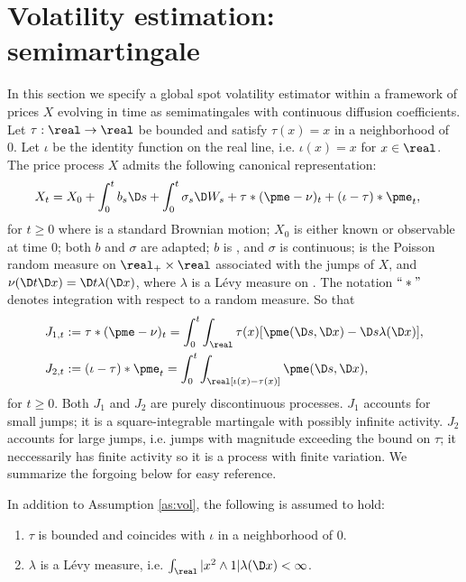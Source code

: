 \section{Volatility estimation: \ito semimartingale} 
In this section we specify a global spot volatility estimator within a framework of prices $X$ evolving in time as \ito semimatingales with continuous diffusion coefficients. 
 Let $\tau: \real \to \real$ be bounded and satisfy $\tau(x) = x$ in a neighborhood of 0.  Let $\iota$ be the identity  function on the real line, i.e.  $\iota(x) = x$ for $x \in \real$. The price process $X$ admits the following  canonical representation:
\begin{align}
  X_t & = X_0 + \int_0^t b_s \D s + \int_0^t \sigma_s \D W_s +  \tau\ast (\pme  - \nu)_t  + (\iota - \tau)\ast \pme_t ,   
  \label{eq:generalsemimartingale}
\end{align}
for $t \ge 0$  where  \sbm is a standard Brownian motion;  $X_0$ is either known or observable at time 0;  both $b$ and $\sigma$ are adapted; $b$ is \cadlag, and $\sigma$ is continuous;  \pme is the Poisson random measure on $\real_+ \times \real$ associated with the jumps of $X$, and $\nu(\D t  \D x)   = \D t  \lambda (\D x) $, where $\lambda$ is a L\'evy  measure on \real. The  notation $``\ast"$ denotes integration with respect to a random measure. So that 
\begin{align}
  &J_{1,t} :=  \tau\ast (\pme  - \nu)_t = \int_0^t\int_\real \tau(x) [\pme(\D s, \D x)   -  \D s \lambda(\D x)], \notag\\
  & J_{2,t}:= (\iota - \tau)\ast \pme_t = \int_0^t\int_\real [\iota(x) - \tau(x)] \pme(\D s, \D x), \notag
  \label{}
\end{align}
for $t \ge 0$. Both  $J_1$ and $J_2$ are purely discontinuous processes. $J_1$ accounts for  small jumps; it is a square-integrable martingale with possibly infinite activity. $J_2$ accounts for large jumps, i.e. jumps with magnitude exceeding the bound on $\tau$; it neccessarily has finite activity so it is a process with finite variation. We summarize the forgoing below for easy reference.
\begin{ass}\label{as:jump}
  In addition to Assumption \eqref{as:vol}, the following is assumed to hold:
  \begin{enumerate}
    \item $\tau$ is bounded and coincides with $\iota$ in a neighborhood of 0.
    \item $\lambda$ is a L\'evy  measure, i.e.  $\int_\real \vert x^2 \wedge 1\vert \lambda(\D x) < \infty$. 
  \end{enumerate}
\end{ass}
